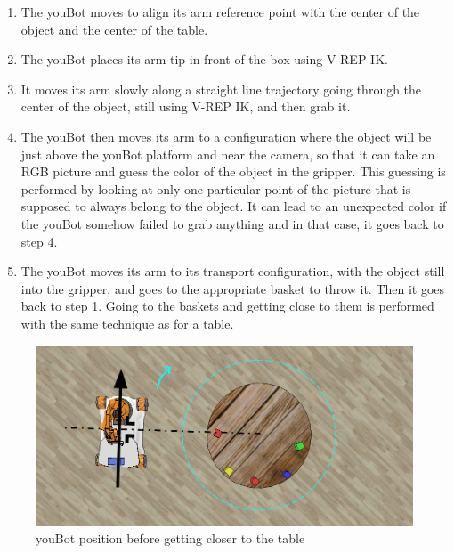 \documentclass[12pt,a4paper]{article}
\begin{document}
\begin{enumerate}
\item The youBot moves to align its arm reference point with the center of the object and the center of the table.
\item The youBot places its arm tip in front of the box using V-REP IK.
\item It moves its arm slowly along a straight line trajectory going through the center of the object, still using V-REP IK, and then grab it.
\item The youBot then moves its arm to a configuration where the object will be just above the youBot platform and near the camera, so that it can take an RGB picture and guess the color of the object in the gripper. This guessing is performed by looking at only one particular point of the picture that is supposed to always belong to the object. It can lead to an unexpected color if the youBot somehow failed to grab anything and in that case, it goes back to step 4.   
\item The youBot moves its arm to its transport configuration, with the object still into the gripper, and goes to the appropriate basket to throw it. Then it goes back to step 1. Going to the baskets and getting close to them is performed with the same technique as for a table.

\end{enumerate}

\begin{figure}[h]
	\centering
		\includegraphics[width=1.00\textwidth]{tangent.png}
	\caption{youBot position before getting closer to the table}
	\label{tangent}
\end{figure}
\end{document}
